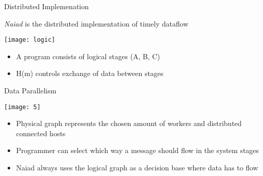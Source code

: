\begin{frame}[t]{Distributed Implemenation}
  \vspace{0.25cm}

  \begin{center}
    \emph{Naiad} is the distributed implementation of timely dataflow
  \end{center}

  \vspace{0.25cm}
  \begin{center}
    \texttt{[image: logic]}
  \end{center}
  \begin{itemize}\setlength\itemsep{0.25cm}
    \item A program consists of logical stages (A, B, C)
    \item H(m) controls exchange of data between stages
  \end{itemize}
\end{frame}

\begin{frame}[t]{Data Parallelism}
   \begin{center}
    \texttt{[image: 5]}
   \end{center}
   \begin{itemize}\setlength\itemsep{0.25cm}
     \item Physical graph represents the chosen amount of workers and distributed connected hosts
     \item Programmer can select which way a message should flow in the system
stages
\item Naiad always uses the logical graph as a decision base where data has to flow
    \end{itemize}

\end{frame}

